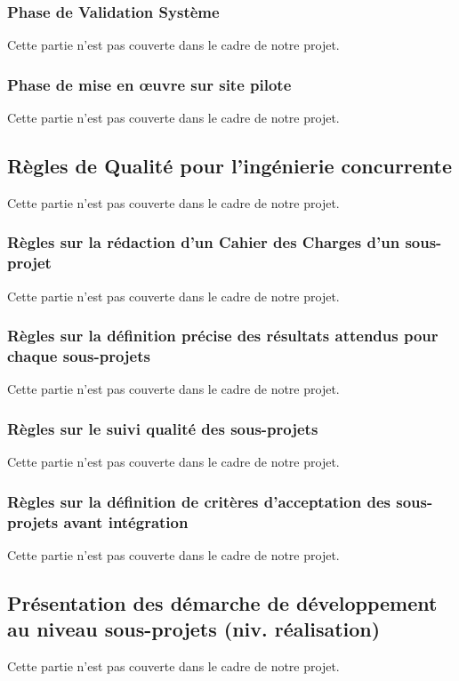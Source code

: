 \documentclass[a4paper]{article}
\begin{document}
\subsubsection{Phase de Validation Système}
Cette partie n'est pas couverte dans le cadre de notre projet.

\subsubsection{Phase de mise en œuvre sur site pilote}
Cette partie n'est pas couverte dans le cadre de notre projet.

\subsection{Règles de Qualité pour l'ingénierie concurrente}
Cette partie n'est pas couverte dans le cadre de notre projet.

\subsubsection{Règles sur la rédaction d'un Cahier des Charges d'un sous-projet}
Cette partie n'est pas couverte dans le cadre de notre projet.

\subsubsection{Règles sur la définition précise des résultats attendus pour chaque sous-projets}
Cette partie n'est pas couverte dans le cadre de notre projet.

\subsubsection{Règles sur le suivi qualité des sous-projets}
Cette partie n'est pas couverte dans le cadre de notre projet.

\subsubsection{Règles sur la définition de critères d'acceptation des sous-projets avant intégration}
Cette partie n'est pas couverte dans le cadre de notre projet.

\subsection{Présentation des démarche de développement au niveau sous-projets (niv. réalisation)}
Cette partie n'est pas couverte dans le cadre de notre projet.
\end{document}
